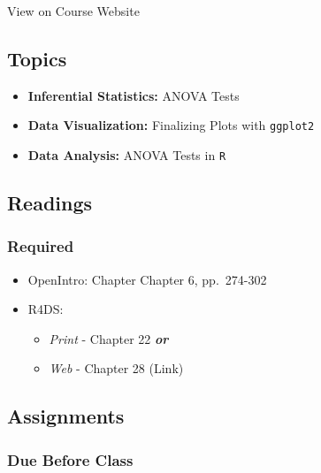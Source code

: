 \documentclass[]{book}
\providecommand{\tightlist}{%
  \setlength{\itemsep}{0pt}\setlength{\parskip}{0pt}}
\theoremstyle{definition}
\theoremstyle{definition}
\theoremstyle{definition}
\theoremstyle{remark}
\begin{document}
View on Course Website

\hypertarget{topics-15}{%
\subsection*{Topics}\label{topics-15}}

\begin{itemize}
\tightlist
\item
  \textbf{Inferential Statistics:} ANOVA Tests
\item
  \textbf{Data Visualization:} Finalizing Plots with \texttt{ggplot2}
\item
  \textbf{Data Analysis:} ANOVA Tests in \texttt{R}
\end{itemize}

\hypertarget{readings-16}{%
\subsection*{Readings}\label{readings-16}}

\hypertarget{required-16}{%
\subsubsection*{Required}\label{required-16}}

\begin{itemize}
\tightlist
\item
  OpenIntro: Chapter Chapter 6, pp.~274-302
\item
  R4DS:

  \begin{itemize}
  \tightlist
  \item
    \emph{Print} - Chapter 22 \textbf{\emph{or}}
  \item
    \emph{Web} - Chapter 28 (Link)
  \end{itemize}
\end{itemize}

\hypertarget{assignments-16}{%
\subsection*{Assignments}\label{assignments-16}}

\hypertarget{due-before-class-14}{%
\subsubsection*{Due Before Class}\label{due-before-class-14}}
\end{document}
